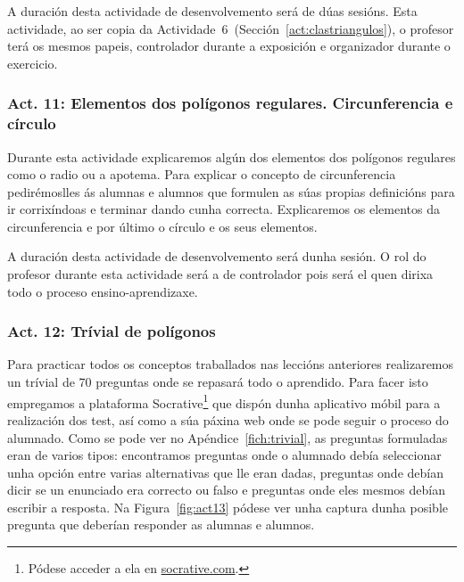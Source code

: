 A duración desta actividade de desenvolvemento será de dúas sesións. Esta actividade, ao ser copia da Actividade~6~(Sección~\ref{act:clastriangulos}), o profesor terá os mesmos papeis, controlador durante a exposición e organizador durante o exercicio.

\subsubsection{Act. 11: Elementos dos polígonos regulares. Circunferencia e círculo}\label{act:elementos}
Durante esta actividade explicaremos algún dos elementos dos polígonos regulares como o radio ou a apotema. Para explicar o concepto de circunferencia pedirémoslles ás alumnas e alumnos que formulen as súas propias definicións para ir corrixíndoas e terminar dando cunha correcta. Explicaremos os elementos da circunferencia e por último o círculo e os seus elementos.

A duración desta actividade de desenvolvemento será dunha sesión. O rol do profesor durante esta actividade será a de controlador pois será el quen dirixa todo o proceso ensino-aprendizaxe.

\subsubsection{Act. 12: Trívial de polígonos}\label{act:trivial}
Para practicar todos os conceptos traballados nas leccións anteriores realizaremos un trívial de 70 preguntas onde se repasará todo o aprendido. Para facer isto empregamos a plataforma Socrative\footnote{Pódese acceder a ela en \href{http://www.socrative.com/}{socrative.com}.} que dispón dunha aplicativo móbil para a realización dos test, así como a súa páxina web onde se pode seguir o proceso do alumnado. Como se pode ver no Apéndice~\ref{fich:trivial}, as preguntas formuladas eran de varios tipos: encontramos preguntas onde o alumnado debía seleccionar unha opción entre varias alternativas que lle eran dadas, preguntas onde debían dicir se un enunciado era correcto ou falso e preguntas onde eles mesmos debían escribir a resposta. Na Figura~\ref{fig:act13} pódese ver unha captura dunha posible pregunta que deberían responder as alumnas e alumnos.

